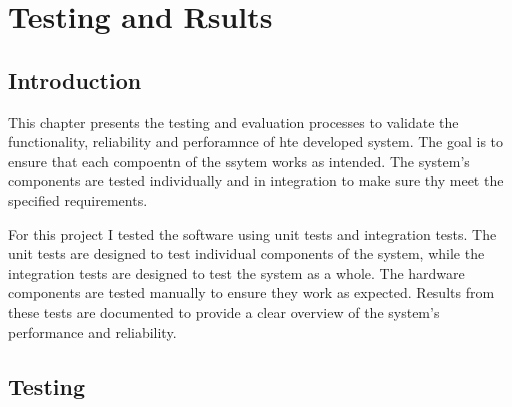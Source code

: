 \chapter{Testing and Rsults}
\section{Introduction}
This chapter presents the testing and evaluation processes to validate the functionality, reliability and perforamnce of hte developed system.
The goal is to ensure that each compoentn of the ssytem works as intended. The system's components are tested individually and in integration to 
make sure thy meet the specified requirements.

For this project I tested the software using unit tests and integration tests. 
The unit tests are designed to test individual components of the system, while the integration tests are designed to test the system as a whole.
The hardware components are tested manually to ensure they work as expected. Results from these tests are documented to provide a clear 
overview of the system's performance and reliability.

\section{Testing}
